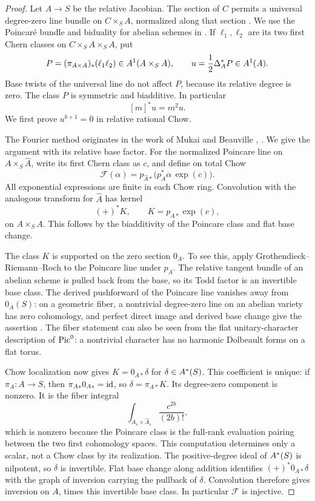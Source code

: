 \begin{proof}
Let \(A\to S\) be the relative Jacobian. The section of \(C\) permits a
universal degree-zero line bundle on \(C\times_S A\), normalized along
that section \cite[Section~9.4, Proposition~4; Section~8.2,
Proposition~4]{BLR}. We use the Poincar\'e bundle and biduality for
abelian schemes in \cite[Section~8.4, Theorem~5]{BLR}.  If \(\ell_1,\ell_2\) are its two first Chern classes on
\(C\times_S A\times_S A\), put
\[
 P=(\pi_{A\times A})_*(\ell_1\ell_2)\in A^1(A\times_S A),
 \qquad u=\frac12\Delta_A^*P\in A^1(A).
\]
Base twists of the universal line do not affect \(P\), because its
relative degree is zero.  The class \(P\) is symmetric and biadditive.
In particular
\begin{equation}
 \label{eq:jacobian-eigenclass}
 [m]^*u=m^2u.
\end{equation}
We first prove \(u^{b+1}=0\) in relative rational Chow.

The Fourier method originates in the work of Mukai and Beauville
\cite[Theorem~2.2]{Mukai1981}, \cite[Section~2, Proposition~3]{Beauville1983}.
We give the argument with its relative base factor.
For the normalized Poincare line on \(A\times_S\widehat A\), write its
first Chern class as \(c\), and define on total Chow
\[
 \mathcal F(\alpha)=
 p_{\widehat A*}\bigl(p_A^*\alpha\,\exp(c)\bigr).
\]
All exponential expressions are finite in each Chow ring.  Convolution
with the analogous transform for \(\widehat A\) has kernel
\[
 (+)^*K,\qquad
 K=p_{A*}\exp(c),
\]
on \(A\times_S A\).  This follows by the biadditivity of the Poincare
class and flat base change.

The class \(K\) is supported on the zero section \(0_A\).  To see this,
apply Grothendieck--Riemann--Roch \cite[Section~7]{BorelSerre} to the Poincare line under
\(p_A\).  The relative tangent bundle of an abelian scheme is pulled
back from the base, so its Todd factor is an invertible base class.
The derived pushforward of the Poincare line vanishes away from
\(0_A(S)\): on a geometric fiber, a nontrivial degree-zero line on an
abelian variety has zero cohomology, and perfect direct image and derived base change give the assertion
\cite[Tags~0B91 and~068V]{Stacks}.  The fiber statement can
also be seen from the flat unitary-character description of
\(\operatorname{Pic}^0\): a nontrivial character has no harmonic Dolbeault forms on a
flat torus.

Chow localization now gives \(K=0_{A*}\delta\) for
\(\delta\in A^*(S)\).  This coefficient is unique: if
\(\pi_A\colon A\to S\), then \(\pi_{A*}0_{A*}=\operatorname{id}\), so
\(\delta=\pi_{A*}K\).  Its degree-zero component is nonzero.  It is
the fiber integral
\[
 \int_{A_s\times\widehat A_s}\frac{c^{2b}}{(2b)!},
\]
which is nonzero because the Poincare class is the full-rank evaluation
pairing between the two first cohomology spaces.  This computation
determines only a scalar, not a Chow class by its realization.
The positive-degree ideal of \(A^*(S)\) is nilpotent, so \(\delta\)
is invertible.  Flat base change along addition identifies
\((+)^*0_{A*}\delta\) with the graph of inversion carrying the
pullback of \(\delta\).  Convolution therefore gives inversion on
\(A\), times this invertible base class.  In particular
\(\mathcal F\) is injective.


\end{proof}
